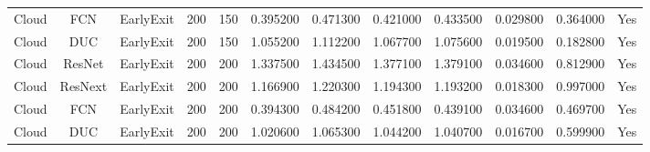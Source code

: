 \begin{tabular}{|c||c||c||c||c||c||c||c||c||c||c||c|}
Cloud & FCN & EarlyExit & 200 & 150 & 0.395200 & 0.471300 & 0.421000 & 0.433500 & 0.029800 & 0.364000 & Yes \\
Cloud & DUC & EarlyExit & 200 & 150 & 1.055200 & 1.112200 & 1.067700 & 1.075600 & 0.019500 & 0.182800 & Yes \\
Cloud & ResNet & EarlyExit & 200 & 200 & 1.337500 & 1.434500 & 1.377100 & 1.379100 & 0.034600 & 0.812900 & Yes \\
Cloud & ResNext & EarlyExit & 200 & 200 & 1.166900 & 1.220300 & 1.194300 & 1.193200 & 0.018300 & 0.997000 & Yes \\
Cloud & FCN & EarlyExit & 200 & 200 & 0.394300 & 0.484200 & 0.451800 & 0.439100 & 0.034600 & 0.469700 & Yes \\
Cloud & DUC & EarlyExit & 200 & 200 & 1.020600 & 1.065300 & 1.044200 & 1.040700 & 0.016700 & 0.599900 & Yes \\
\bottomrule
\end{tabular}
